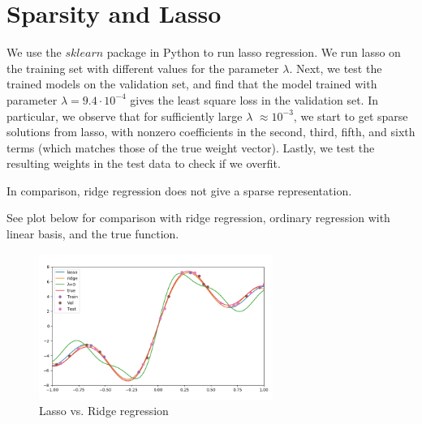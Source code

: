 \documentclass[8pt]{article}
\begin{document}


\section{Sparsity and Lasso}

We use the $sklearn$ package in Python to run lasso regression. We run lasso on the training set with different values for the parameter $\lambda$. Next, we test the trained models on the validation set, and find that the model trained with parameter $\lambda = 9.4 \cdot 10^{-4}$ gives the least square loss in the validation set. In particular, we observe that for sufficiently large $\lambda$ $\approx 10^{-3}$, we start to get sparse solutions from lasso, with nonzero coefficients in the second, third, fifth, and sixth terms (which matches those of the true weight vector). Lastly, we test the resulting weights in the test data to check if we overfit.


In comparison, ridge regression does not give a sparse representation.

See plot below for comparison with ridge regression, ordinary regression with linear basis, and the true function.

\begin{figure}[H]
  \centering
  \includegraphics[width = 3in]{../P4/figs/lasso_ridge.png}
  \caption{Lasso vs. Ridge regression}
\end{figure}


\end{document}
